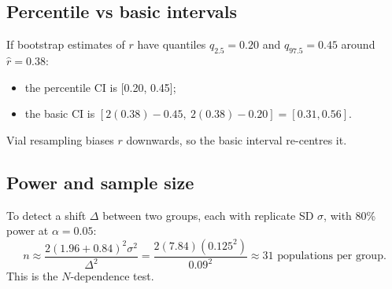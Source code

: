 \subsection{Percentile vs basic intervals}
If bootstrap estimates of $r$ have quantiles $q_{2.5}=0.20$ and $q_{97.5}=0.45$ around $\hat r=0.38$:
\begin{itemize}
\item the percentile CI is [0.20, 0.45];
\item the basic CI is $[2(0.38)-0.45,\ 2(0.38)-0.20]=[0.31,0.56]$.
\end{itemize}
Vial resampling biases $r$ downwards, so the basic interval re-centres it.

\subsection{Power and sample size}
To detect a shift $\Delta$ between two groups, each with replicate SD $\sigma$, with 80\% power at $\alpha=0.05$:
\[
n\approx\frac{2(1.96+0.84)^2\sigma^2}{\Delta^2}=\frac{2(7.84)(0.125^2)}{0.09^2}\approx31 \text{ populations per group}.
\]
This is the $N$-dependence test.

